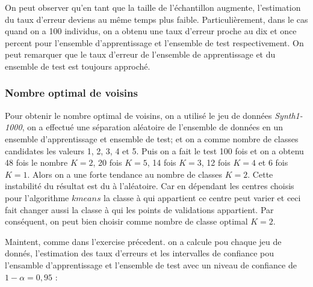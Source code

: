 \documentclass[a4paper,11pt]{article}
\begin{document}
On peut observer qu'en tant que la taille de l'échantillon augmente, l'estimation du taux d'erreur deviens au même temps plus faible. Particulièrement, dans le cas quand on a 100 individus, on a obtenu une taux d'erreur proche au dix et once percent pour l’ensemble d’apprentissage et l'ensemble de test respectivement. On peut remarquer que le taux d'erreur de l'ensemble de apprentissage et du ensemble de test est toujours approché.

\subsubsection*{Nombre optimal de voisins}

Pour obtenir le nombre optimal de voisins, on a utilisé le jeu de données \textit{Synth1-1000}, on a effectué une séparation aléatoire de l’ensemble de données en un ensemble d’apprentissage et ensemble de test; et on a comme nombre de classes candidates les valeurs 1, 2, 3, 4 et 5. Puis on a fait le test 100 fois et on a obtenu 48 fois le nombre $K=2$, 20 fois $K=5$, 14 fois $K=3$, 12 fois $K=4$ et 6 fois $K=1$. Alors on a une forte tendance au nombre de classes $K=2$. 
Cette instabilité du résultat est du à l'aléatoire. Car en dépendant les centres choisis pour l'algorithme $kmeans$ la classe à qui appartient ce centre peut varier et ceci fait changer aussi la classe à qui les points de validations appartient.
Par conséquent, on peut bien choisir comme nombre de classe optimal $K=2$.

Maintent, comme dans l'exercise précedent. on a calcule pou chaque jeu de donnés, l'estimation des taux d'erreurs et les intervalles de confiance pou l'ensamble d’apprentissage et l’ensemble de test avec un niveau de confiance de $1 - \alpha = 0,95$ : 
\end{document}

